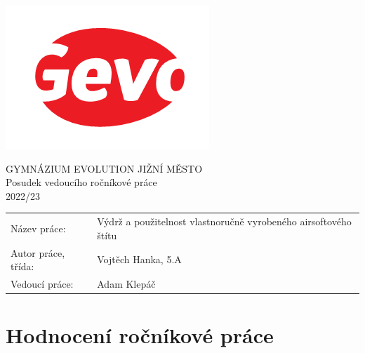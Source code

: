 \documentclass[a4paper,10pt]{article}
\begin{document}
\thispagestyle{fancy}
\begin{minipage}{.3\textwidth}
 \includegraphics[width=\textwidth]{logo}
\end{minipage}
\hfill
\begin{minipage}{.69\textwidth}
 \centering
 \Large{\sffamily
  GYMNÁZIUM EVOLUTION JIŽNÍ MĚSTO\\
  Posudek vedoucího ročníkové práce\\
  2022/23
 }
\end{minipage}

\begin{center}
 \large{
 \begin{tabular}{ll}
  \textsf{Název práce:} &
  \textsf{
   Výdrž a použitelnost vlastnoručně
vyrobeného airsoftového štítu
  }\\
  \textsf{Autor práce, třída:} &
  \textsf{
   Vojtěch Hanka, 5.A
  }\\
  \textsf{Vedoucí práce:} &
  \textsf{
   Adam Klepáč
  }
 \end{tabular}
 }
\end{center}

\section*{\sffamily \centering Hodnocení ročníkové práce}
\end{document}
